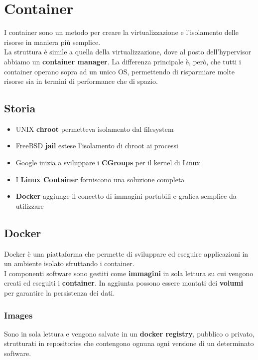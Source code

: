 \newpage
\section{Container}
I container sono un metodo per creare la virtualizzazione e l'isolamento delle risorse in maniera più semplice.\\
La struttura è simile a quella della virtualizzazione, dove al posto dell'hypervisor abbiamo un \textbf{container manager}. La differenza principale è, però, che tutti i container operano sopra ad un unico OS, permettendo di risparmiare molte risorse sia in termini di performance che di spazio.

\subsection{Storia}
\begin{itemize}
	\item UNIX \textbf{chroot} permetteva isolamento dal filesystem
	\item FreeBSD \textbf{jail} estese l'isolamento di chroot ai processi
	\item Google inizia a sviluppare i \textbf{CGroups} per il kernel di Linux
	\item I \textbf{Linux Container} forniscono una soluzione completa
	\item \textbf{Docker} aggiunge il concetto di immagini portabili e grafica semplice da utilizzare
\end{itemize}

\subsection{Docker}
Docker è una piattaforma che permette di sviluppare ed eseguire applicazioni in un ambiente isolato sfruttando i container.\\
I componenti software sono gestiti come \textbf{immagini} in sola lettura su cui vengono creati ed eseguiti i \textbf{container}. In aggiunta possono essere montati dei \textbf{volumi} per garantire la persistenza dei dati.

\subsubsection{Images}
Sono in sola lettura e vengono salvate in un \textbf{docker registry}, pubblico o privato, strutturati in repositories che contengono ognuna ogni versione di un determinato software.

